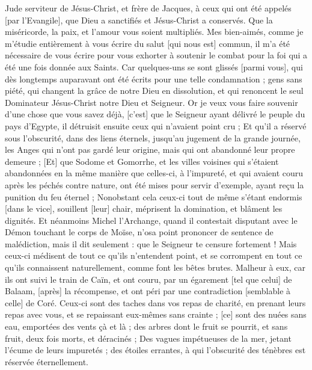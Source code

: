 \BFont
\begin{multicols}{2}
\VerseOne{}Jude serviteur de Jésus-Christ, et frère de Jacques, à ceux qui ont été appelés [par l'Evangile], que Dieu a sanctifiés et Jésus-Christ a conservés.
Que la miséricorde, la paix, et l'amour vous soient multipliés.
Mes bien-aimés, comme je m'étudie entièrement à vous écrire du salut [qui nous est] commun, il m'a été nécessaire de vous écrire pour vous exhorter à soutenir le combat pour la foi qui a été une fois donnée aux Saints.
Car quelques-uns se sont glissés [parmi vous], qui dès longtemps auparavant ont été écrits pour une telle condamnation ; gens sans piété, qui changent la grâce de notre Dieu en dissolution, et qui renoncent le seul Dominateur Jésus-Christ notre Dieu et Seigneur.
Or je veux vous faire souvenir d'une chose que vous savez déjà, [c'est] que le Seigneur ayant délivré le peuple du pays d'Egypte, il détruisit ensuite ceux qui n'avaient point cru ;
Et qu'il a réservé sous l'obscurité, dans des liens éternels, jusqu'au jugement de la grande journée, les Anges qui n'ont pas gardé leur origine, mais qui ont abandonné leur propre demeure ;
[Et] que Sodome et Gomorrhe, et les villes voisines qui s'étaient abandonnées en la même manière que celles-ci, à l'impureté, et qui avaient couru après les péchés contre nature, ont été mises pour servir d'exemple, ayant reçu la punition du feu éternel ;
Nonobstant cela ceux-ci tout de même s'étant endormis [dans le vice], souillent [leur] chair, méprisent la domination, et blâment les dignités.
Et néanmoins Michel l'Archange, quand il contestait disputant avec le Démon touchant le corps de Moïse, n'osa point prononcer de sentence de malédiction, mais il dit seulement : que le Seigneur te censure fortement !
Mais ceux-ci médisent de tout ce qu'ils n'entendent point, et se corrompent en tout ce qu'ils connaissent naturellement, comme font les bêtes brutes.
Malheur à eux, car ils ont suivi le train de Caïn, et ont couru, par un égarement [tel que celui] de Balaam, [après] la récompense, et ont péri par une contradiction [semblable à celle] de Coré.
Ceux-ci sont des taches dans vos repas de charité, en prenant leurs repas avec vous, et se repaissant eux-mêmes sans crainte ; [ce] sont des nuées sans eau, emportées des vents çà et là ; des arbres dont le fruit se pourrit, et sans fruit, deux fois morts, et déracinés ;
Des vagues impétueuses de la mer, jetant l'écume de leurs impuretés ; des étoiles errantes, à qui l'obscurité des ténèbres est réservée éternellement.

\end{multicols}
